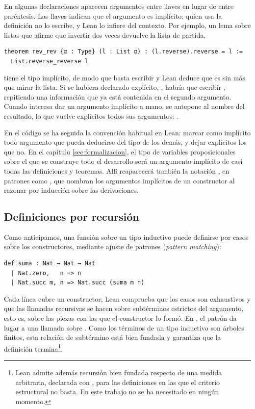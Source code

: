 En algunas declaraciones aparecen argumentos entre llaves en lugar de entre paréntesis. Las llaves indican que el argumento es implícito: quien usa la definición no lo escribe, y Lean lo infiere del contexto. Por ejemplo, un lema sobre listas que afirme que invertir dos veces devuelve la lista de partida,

\begin{lstlisting}
theorem rev_rev {α : Type} (l : List α) : (l.reverse).reverse = l :=
  List.reverse_reverse l
\end{lstlisting}

\noindent tiene el tipo  implícito, de modo que basta escribir  y Lean deduce que  es  sin más que mirar la lista. Si  se hubiera declarado explícito, , habría que escribir , repitiendo una información que ya está contenida en el segundo argumento. Cuando interesa dar un argumento implícito a mano, se antepone  al nombre del resultado, lo que vuelve explícitos todos sus argumentos: .

En el código se ha seguido la convención habitual en Lean: marcar como implícito todo argumento que pueda deducirse del tipo de los demás, y dejar explícitos los que no. En el capítulo \ref{sec:formalizacion}, el tipo de variables proposicionales sobre el que se construye todo el desarrollo será un argumento implícito de casi todas las definiciones y teoremas. Allí reaparecerá también la notación , en patrones como , que nombran los argumentos implícitos de un constructor al razonar por inducción sobre las derivaciones.

\subsection*{Definiciones por recursión}

Como anticipamos, una función sobre un tipo inductivo puede definirse por casos sobre los constructores, mediante ajuste de patrones (\emph{pattern matching}):

\begin{lstlisting}
def suma : Nat → Nat → Nat
  | Nat.zero,   n => n
  | Nat.succ m, n => Nat.succ (suma m n)
\end{lstlisting}

Cada línea  cubre un constructor; Lean comprueba que los casos son exhaustivos y que las llamadas recursivas se hacen sobre subtérminos estrictos del argumento, esto es, sobre las piezas con las que el constructor lo formó. En , el patrón  da lugar a una llamada sobre . Como los términos de un tipo inductivo son árboles finitos, esta relación de subtérmino está bien fundada y garantiza que la definición termina\footnote{Lean admite además recursión bien fundada respecto de una medida arbitraria, declarada con , para las definiciones en las que el criterio estructural no basta. En este trabajo no se ha necesitado en ningún momento.}.

